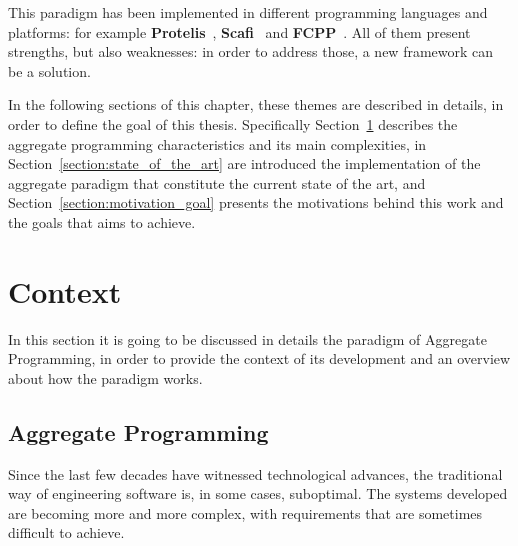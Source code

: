 This paradigm has been implemented in different programming languages and platforms: for example \textbf{Protelis}~\cite{protelis_introduction}, \textbf{Scafi}~\cite{scafi_introduction} and \textbf{FCPP}~\cite{fcpp_introduction}. All of them present strengths, but also weaknesses: in order to address those, a new framework can be a solution.

In the following sections of this chapter, these themes are described in details, in order to define the goal of this thesis. Specifically Section~\ref{section:aggregate_programming_introduction} describes the aggregate programming characteristics and its main complexities, in Section~\ref{section:state_of_the_art} are introduced the implementation of the aggregate paradigm that constitute the current state of the art, and Section~\ref{section:motivation_goal} presents the motivations behind this work and the goals that aims to achieve.

\section{Context}\label{section:aggregate_programming_introduction}
In this section it is going to be discussed in details the paradigm of Aggregate Programming, in order to provide the context of its development and an overview about how the paradigm works.

\subsection{Aggregate Programming}
Since the last few decades have witnessed technological advances, the traditional way of engineering software is, in some cases, suboptimal.\newline
The systems developed are becoming more and more complex, with requirements that are sometimes difficult to achieve. 

